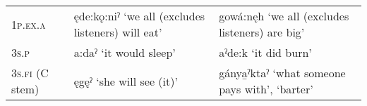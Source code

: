 \begin{table}
\begin{tabularx}{\textwidth}{QQQ}
\tablevspace
{} \newline \textsc{1p.ex.a} & ęde:kǫ:niˀ \newline ‘we all (excludes listeners) will eat’ & gowá:nęh \newline ‘we all (excludes listeners) are big’\\
\tablevspace
{} \newline \textsc{3s.p} & a:daˀ \newline ‘it would sleep’ & aˀde:k \newline ‘it did burn’\\
\tablevspace
{} \newline \textsc{3s.fi} (C stem) & ęgęˀ \newline ‘she will see (it)’ & gánya̱ˀktaˀ \newline ‘what someone pays with’, \newline ‘barter’\\
\midrule
\end{tabularx}
\end{table}


